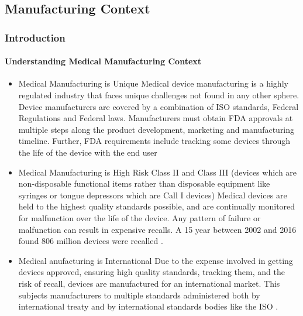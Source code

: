 \subsection{Manufacturing Context}
\begin{frame}
  \frametitle{Introduction}
  \framesubtitle{Understanding Medical Manufacturing Context}
  \begin{itemize}
    \item<1-> Medical Manufacturing is Unique
       {\scriptsize{Medical device manufacturing is a highly regulated industry that faces unique challenges not found in any other sphere. Device manufacturers are covered by a combination of ISO standards, Federal Regulations and Federal laws. Manufacturers must obtain FDA approvals at multiple steps along the product development, marketing and manufacturing timeline. Further, FDA requirements include tracking some devices through the life of the device with the end user \parencite{johnsonFDARegulationMedical2016}}}

    \item<2-> Medical Manufacturing is High Risk
       {\scriptsize{Class II and Class III (devices which are non-disposable functional items rather than disposable equipment like syringes or tongue depressors which are Call I devices) Medical devices are held to the highest quality standards possible, and are continually monitored for malfunction over the life of the device. Any pattern of failure or malfunction can result in expensive recalls. A 15 year between 2002 and  2016 found 806 million devices were recalled \parencite{ghobadiApprovaladjustedRecallRates2019}. }}

    \item<3-> Medical anufacturing is International
       {\scriptsize{Due to the expense involved in getting devices approved, ensuring high quality standards, tracking them, and the risk of recall, devices are manufactured for an international market. This subjects manufacturers to multiple standards administered both by international treaty and by international standards bodies like the ISO \parencite{schuhCompilationInternationalStandards2019}.}}

  \end{itemize}
\end{frame}
